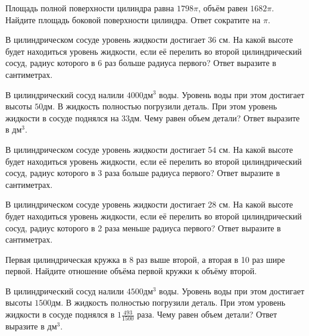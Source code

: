 \documentclass[4apaper]{article}
\begin{document}
\begin{taskBN}{43}
Площадь полной поверхности цилиндра равна $1798\pi$, объём равен $1682\pi$. Найдите площадь боковой поверхности цилиндра. Ответ сократите на $\pi$.
\end{taskBN}

\begin{taskBN}{44}
В цилиндрическом сосуде уровень жидкости достигает 36 см. На какой высоте будет находиться уровень жидкости, если её перелить во второй цилиндрический сосуд, радиус которого в 6 раз больше радиуса первого? Ответ выразите в сантиметрах.
\end{taskBN}

\begin{taskBN}{45}
В цилиндрический сосуд налили $4000\mbox{дм}^3$ воды. Уровень воды при этом достигает высоты $50$дм. В жидкость полностью погрузили деталь. При этом уровень жидкости в сосуде поднялся на $33$дм. Чему равен объем детали? Ответ выразите в $\mbox{дм}^3$.
\end{taskBN}

\begin{taskBN}{46}
В цилиндрическом сосуде уровень жидкости достигает 54 см. На какой высоте будет находиться уровень жидкости, если её перелить во второй цилиндрический сосуд, радиус которого в 3 раза больше радиуса первого? Ответ выразите в сантиметрах.
\end{taskBN}

\begin{taskBN}{47}
В цилиндрическом сосуде уровень жидкости достигает 28 см. На какой высоте будет находиться уровень жидкости, если её перелить во второй цилиндрический сосуд, радиус которого в 2 раза меньше радиуса первого? Ответ выразите в сантиметрах.
\end{taskBN}

\begin{taskBN}{48}
 Первая цилиндрическая кружка в 8 раз выше второй, а вторая в 10 раз шире первой. Найдите отношение объёма первой кружки к объёму второй.
\end{taskBN}

\begin{taskBN}{49}
В цилиндрический сосуд налили $4500\mbox{дм}^3$ воды. Уровень воды при этом достигает высоты $1500$дм. В жидкость полностью погрузили деталь. При этом уровень жидкости в сосуде поднялся в ${1}\frac{493}{1500}$ раза. Чему равен объем детали? Ответ выразите в $\mbox{дм}^3$.
\end{taskBN}
\end{document}
